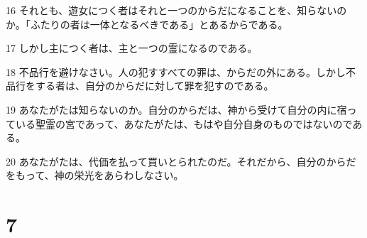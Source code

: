 \par 16 それとも、遊女につく者はそれと一つのからだになることを、知らないのか。「ふたりの者は一体となるべきである」とあるからである。
\par 17 しかし主につく者は、主と一つの霊になるのである。
\par 18 不品行を避けなさい。人の犯すすべての罪は、からだの外にある。しかし不品行をする者は、自分のからだに対して罪を犯すのである。
\par 19 あなたがたは知らないのか。自分のからだは、神から受けて自分の内に宿っている聖霊の宮であって、あなたがたは、もはや自分自身のものではないのである。
\par 20 あなたがたは、代価を払って買いとられたのだ。それだから、自分のからだをもって、神の栄光をあらわしなさい。

\chapter{7}

